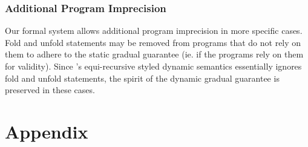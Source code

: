 \documentclass {llncs}
\begin{document}
\subsubsection{Additional Program Imprecision}
Our formal system allows additional program imprecision in more specific cases. Fold and unfold statements may be removed from programs that do not rely on them to adhere to the static gradual guarantee (ie. if the programs rely on them for validity). Since \gvlrp's equi-recursive styled dynamic semantics essentially ignores fold and unfold statements, the spirit of the dynamic gradual guarantee is preserved in these cases.

%
%
%



\clearpage
\appendix
\section{Appendix}
\end{document}

